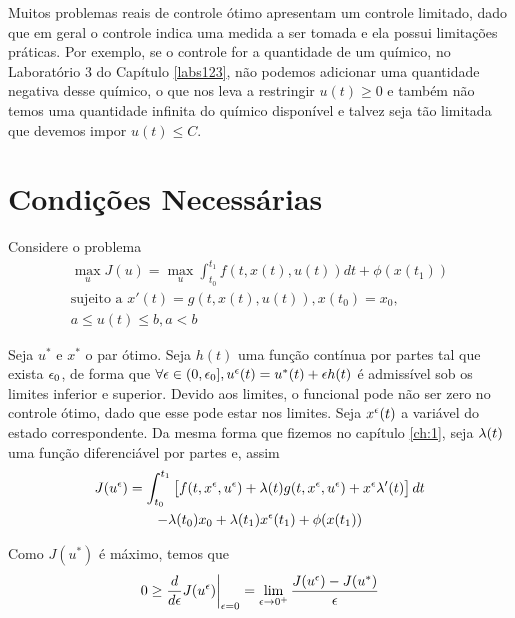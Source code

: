 Muitos problemas reais de controle ótimo apresentam um controle limitado, dado
que em geral o controle indica uma medida a ser tomada e ela possui limitações
práticas. Por exemplo, se o controle for a quantidade de um químico, no
Laboratório 3 do Capítulo \ref{labs123}, não podemos adicionar uma quantidade
negativa desse químico, o que nos leva a restringir $u(t) \ge 0$ e também não
temos uma quantidade infinita do químico disponível e talvez seja tão limitada
que devemos impor $u(t) \le C$. 

\section{Condições Necessárias} 

Considere o problema
\begin{gather*}
    \max_u J(u) = \max_u \int_{t_0}^{t_1} f(t,x(t),u(t))dt + \phi(x(t_1)) \\
    \text{sujeito a   }x'(t) = g(t,x(t),u(t)), x(t_0) = x_0, \\
    a \leq u(t) \leq b, a < b
\end{gather*}

Seja $u^*$ e $x^*$ o par ótimo. Seja $h(t)$ uma função contínua por partes tal
que exista $\epsilon_0$, de forma que $\forall \epsilon \in (0,\epsilon_0], u^{\epsilon}(t) = u^*(t) +
\epsilon h(t)$ é admissível sob os limites inferior e superior. Devido aos limites,
o funcional pode não ser zero no controle ótimo, dado que esse pode estar nos
limites. Seja $x^{\epsilon}(t)$ a variável do estado correspondente. Da mesma forma
que fizemos no capítulo \ref{ch:1}, seja $\lambda(t)$ uma função diferenciável por
partes e, assim 
\begin{multline}
    \label{eq:8-1}
    J(u^{\epsilon}) = \int_{t_0}^{t_1} \left[f(t,x^{\epsilon}, u^{\epsilon}) + \lambda(t)g(t,x^{\epsilon}, u^{\epsilon}) + x^{\epsilon}\lambda '(t)\right]dt \\
    - \lambda(t_0)x_0 + \lambda(t_1)x^{\epsilon}(t_1) + \phi(x(t_1))
\end{multline}    

Como $J(u^*)$ é máximo, temos que 
\begin{equation}
    \label{eq:8-2}
    0 \ge \frac{d}{d\epsilon}J(u^{\epsilon})\bigg\vert_{\epsilon = 0} = \lim_{\epsilon \to 0^+} \frac{J(u^{\epsilon}) - J(u^*)}{\epsilon}
\end{equation}

